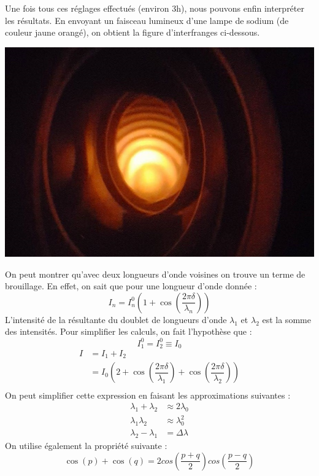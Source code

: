 \documentclass[12pt,a4paper]{article}
\begin{document}
	Une fois tous ces réglages effectués (environ 3h), nous pouvons enfin interpréter les résultats. En envoyant un faisceau lumineux d'une lampe de sodium (de couleur jaune orangé), on obtient la figure d'interfranges ci-dessous.
	\begin{center}
		\includegraphics[scale=0.5]{photo1}
	\end{center}
	On peut montrer qu'avec deux longueurs d'onde voisines on trouve un terme de brouillage. En effet, on sait que pour une longueur d'onde donnée :
	$$I_n = I^{0}_{n} (1+\cos(\dfrac{2\pi\delta}{\lambda_n}))$$
	L'intensité de la résultante du doublet de longueurs d'onde $\lambda_1$ et $\lambda_2$ est la somme des intensités. Pour simplifier les calculs, on fait l'hypothèse que :
	\begin{equation}
	I^{0}_{1}=I^{0}_{2}\equiv I_{0}
	\end{equation}
	\begin{align*}
	I &= I_1 + I_2\\
	&= I_0(2+\cos(\dfrac{2\pi\delta}{\lambda_1})+\cos(\dfrac{2\pi\delta}{\lambda_2}))\\
	\end{align*}
	On peut simplifier cette expression en faisant les approximations suivantes : 
	\begin{align}
	\lambda_1+\lambda_2 &\approx 2\lambda_0\\
	\lambda_1\lambda_2 &\approx \lambda_{0}^2\\
	\lambda_2-\lambda_1 &= \Delta\lambda
	\end{align}
	On utilise également la propriété suivante :
	$$\cos(p) + \cos(q) = 2cos(\frac{p+q}{2})cos(\frac{p-q}{2})$$
\end{document}
